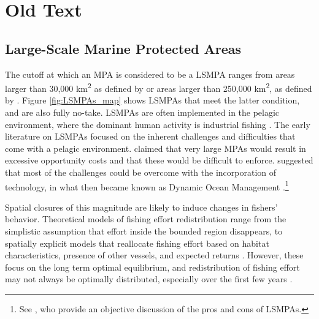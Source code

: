 \documentclass[9p,twocolumn,twoside,lineno]{pnas-new}
\begin{document}
\section{Old Text}

\subsection{Large-Scale Marine Protected Areas}\label{lsmpas}

The cutoff at which an MPA is considered to be a LSMPA ranges from areas
larger than 30,000 km\textsuperscript{2} as defined by
\cite{desanto_2013} or areas larger than 250,000 km\textsuperscript{2},
as defined by \cite{toonen_2013}. Figure \ref{fig:LSMPAs_map} shows
LSMPAs that meet the latter condition, and are also fully no-take. LSMPAs are often
implemented in the pelagic environment, where the dominant human
activity is industrial fishing \cite{gray_2017,kroodsma_2018}. The
early literature on LSMPAs focused on the inherent challenges and
difficulties that come with a pelagic environment. \cite{kaplan_2010}
claimed that very large MPAs would result in excessive opportunity costs
and that these would be difficult to enforce. \cite{game_2009}
suggested that most of the challenges could be overcome with the
incorporation of technology, in what then became known as Dynamic Ocean
Management \citep{maxwell_2015}.\footnote{See \cite{singleton_2014}, who provide an objective discussion of the pros and cons of LSMPAs.} 

Spatial closures of this magnitude are likely to induce changes in
fishers' behavior. Theoretical models of fishing effort redistribution
range from the simplistic assumption that effort inside the bounded
region disappears, to spatially explicit models that reallocate fishing
effort based on habitat characteristics, presence of other vessels, and
expected returns \citep{smith_2003,hilborn_2006}. However, these focus
on the long term optimal equilibrium, and redistribution of fishing
effort may not always be optimally distributed, especially over the first few years
\citep{stevenson_2013}.
\end{document}
